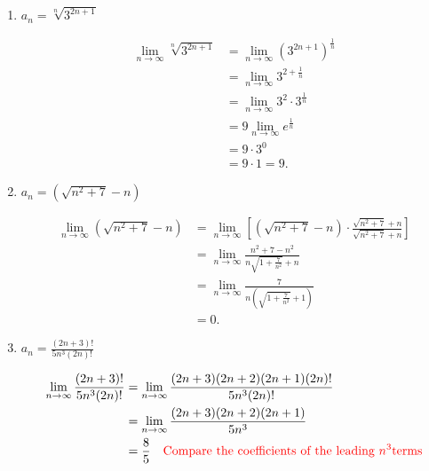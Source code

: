 \documentclass[noinstructornotes]{ximera}
\begin{document}
\begin{problem}
\begin{enumerate}
\begin{problem}
\begin{enumerate}
	
	
	\item  $a_n = \sqrt[n]{3^{2n+1}}$
	\begin{freeResponse}
		\begin{align*}
		\lim_{n \to \infty} \sqrt[n]{3^{2n+1}}
		&= \lim_{n \to \infty} \left( 3^{2n+1} \right)^{\frac{1}{n}}  \\
		&= \lim_{n \to \infty} 3^{2 + \frac{1}{n}}  \\
		&= \lim_{n \to \infty} 3^2 \cdot 3^{\frac{1}{n}}  \\
		&= 9 \lim_{n \to \infty} e^{\frac{1}{n}}  \\
		&= 9 \cdot 3^0  \\
		&= 9 \cdot 1 = 9.
		\end{align*}
	\end{freeResponse}
	
	
	
	\item  $a_n = \left( \sqrt{n^2+7} - n \right)$
	\begin{freeResponse}
		\begin{align*}
		\lim_{n \to \infty} \left( \sqrt{n^2+7} - n \right)
		&= \lim_{n \to \infty} \left[ \left( \sqrt{n^2 + 7} - n \right) \cdot \frac{\sqrt{n^2 + 7} + n}{\sqrt{n^2 + 7} + n} \right]  \\
		&= \lim_{n \to \infty} \frac{n^2 + 7 - n^2}{n \sqrt{1 + \frac{7}{n^2}} + n}  \\
		&= \lim_{n \to \infty} \frac{7}{n ( \sqrt{1 + \frac{7}{n^2}} + 1)}  \\
		&= 0.
		\end{align*}
	\end{freeResponse}
	
	
	
	\item  $a_n = \frac{(2n+3)!}{5n^3 (2n)!}$
	\begin{freeResponse}
		\begin{align*}
		\lim_{n \to \infty} \frac{(2n+3)!}{5n^3(2n)!}
		&= \lim_{n \to \infty} \frac{(2n+3)(2n+2)(2n+1)(2n)!}{5n^3(2n)!}  \\
		&= \lim_{n \to \infty} \frac{(2n+3)(2n+2)(2n+1)}{5n^3}  \\
		&= \frac{8}{5} 	\quad	{\color{red}\text{Compare the coefficients of the leading }n^3 \text{terms}}
		\end{align*}
	\end{freeResponse}
	
	
	

\end{enumerate}
\end{problem}
\end{enumerate}
\end{problem}
\end{document}
